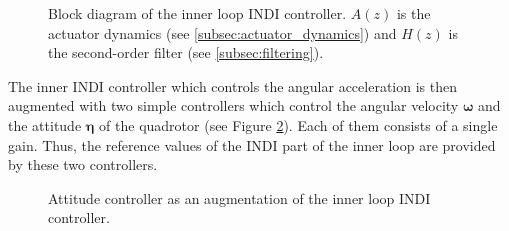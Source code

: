 \documentclass[11pt, a4paper, twoside]{report}
\begin{document}
\begin{figure}[H]
	\centering 
	\captionsetup{justification=centering, singlelinecheck=off, font=bf, belowskip=-0.5cm}
	\caption[Block diagram of the inner loop \acrshort{INDI} controller]{Block diagram of the inner loop \acrshort{INDI} controller. $A(z)$ is the actuator dynamics (see \ref{subsec:actuator_dynamics}) and $H(z)$ is the second-order filter (see \ref{subsec:filtering}).}
	\label{fig:indi_inner_croped}
\end{figure}
The inner \acrshort{INDI} controller which controls the angular acceleration is then augmented with two simple controllers which control the angular velocity $\bm{\omega}$ and the attitude $\bm{\eta}$ of the quadrotor (see Figure \ref{fig:pid_inner_croped}). Each of them consists of a single gain. Thus, the reference values of the \acrshort{INDI} part of the inner loop are provided by these two controllers. \begin{figure}[H]
	\centering 
	\captionsetup{justification=centering, singlelinecheck=off, font=bf, belowskip=-0.5cm}
	\caption[Attitude controller as an augmentation of the inner loop \acrshort{INDI} controller]{Attitude controller as an augmentation of the inner loop \acrshort{INDI} controller.}
	\label{fig:pid_inner_croped}
\end{figure}
\end{document}
